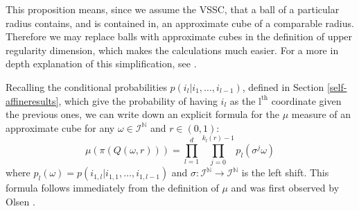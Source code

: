 \documentclass[12pt]{amsart}
\numberwithin{equation}{section}
\begin{document}
This proposition means, since we assume the VSSC, that a ball of a particular radius contains, and is contained in, an approximate cube of a comparable radius.  Therefore we may replace balls with approximate cubes in the definition of upper regularity dimension, which makes the calculations much easier.    For  a more in depth explanation of this simplification, see \cite{fraser-howroyd}.

Recalling the conditional probabilities $p(i_{l}\vert i_{1},\ldots,i_{l-1})$, defined in Section \ref{self-affineresults}, which give the probability of having $i_{l}$ as the $\text{l}^{\text{th}}$ coordinate given the previous ones, we can write down an explicit formula for the $\mu $ measure of an approximate cube for any $\omega \in \mathcal{I}^{\mathbb{N}}$ and $r \in (0,1)$:
\begin{equation} \label{approxcubemeasure}
 \mu(\pi(Q(\omega,r)))=\prod^d_{l=1} \prod_{j=0}^{k_l(r)-1}p_l(\sigma^j\omega)
\end{equation}
where $p_l(\omega)=p(i_{1,l}\vert i_{1,1},\ldots,i_{1,l-1})$ and $\sigma: \mathcal{I}^{\mathbb{N}} \to \mathcal{I}^{\mathbb{N}}$ is the left shift.  This formula follows immediately from the definition of $\mu$ and was first observed by Olsen   \cite[(6.2)]{sponges}.
\end{document}
